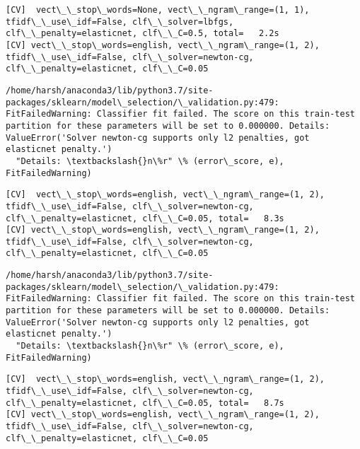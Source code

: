 \documentclass[11pt]{article}
\begin{document}
    \begin{Verbatim}[commandchars=\\\{\}]
[CV]  vect\_\_stop\_words=None, vect\_\_ngram\_range=(1, 1), tfidf\_\_use\_idf=False, clf\_\_solver=lbfgs, clf\_\_penalty=elasticnet, clf\_\_C=0.5, total=   2.2s
[CV] vect\_\_stop\_words=english, vect\_\_ngram\_range=(1, 2), tfidf\_\_use\_idf=False, clf\_\_solver=newton-cg, clf\_\_penalty=elasticnet, clf\_\_C=0.05 

    \end{Verbatim}

    \begin{Verbatim}[commandchars=\\\{\}]
/home/harsh/anaconda3/lib/python3.7/site-packages/sklearn/model\_selection/\_validation.py:479: FitFailedWarning: Classifier fit failed. The score on this train-test partition for these parameters will be set to 0.000000. Details: 
ValueError('Solver newton-cg supports only l2 penalties, got elasticnet penalty.')
  "Details: \textbackslash{}n\%r" \% (error\_score, e), FitFailedWarning)

    \end{Verbatim}

    \begin{Verbatim}[commandchars=\\\{\}]
[CV]  vect\_\_stop\_words=english, vect\_\_ngram\_range=(1, 2), tfidf\_\_use\_idf=False, clf\_\_solver=newton-cg, clf\_\_penalty=elasticnet, clf\_\_C=0.05, total=   8.3s
[CV] vect\_\_stop\_words=english, vect\_\_ngram\_range=(1, 2), tfidf\_\_use\_idf=False, clf\_\_solver=newton-cg, clf\_\_penalty=elasticnet, clf\_\_C=0.05 

    \end{Verbatim}

    \begin{Verbatim}[commandchars=\\\{\}]
/home/harsh/anaconda3/lib/python3.7/site-packages/sklearn/model\_selection/\_validation.py:479: FitFailedWarning: Classifier fit failed. The score on this train-test partition for these parameters will be set to 0.000000. Details: 
ValueError('Solver newton-cg supports only l2 penalties, got elasticnet penalty.')
  "Details: \textbackslash{}n\%r" \% (error\_score, e), FitFailedWarning)

    \end{Verbatim}

    \begin{Verbatim}[commandchars=\\\{\}]
[CV]  vect\_\_stop\_words=english, vect\_\_ngram\_range=(1, 2), tfidf\_\_use\_idf=False, clf\_\_solver=newton-cg, clf\_\_penalty=elasticnet, clf\_\_C=0.05, total=   8.7s
[CV] vect\_\_stop\_words=english, vect\_\_ngram\_range=(1, 2), tfidf\_\_use\_idf=False, clf\_\_solver=newton-cg, clf\_\_penalty=elasticnet, clf\_\_C=0.05 

    \end{Verbatim}
\end{document}
